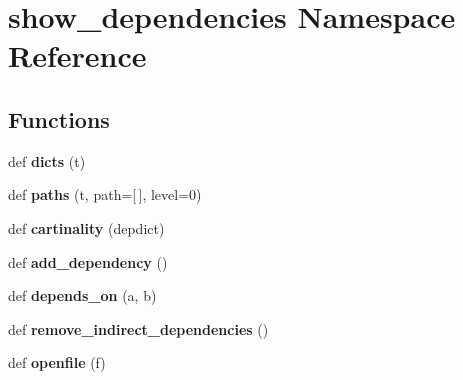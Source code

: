 \hypertarget{namespaceshow__dependencies}{}\section{show\+\_\+dependencies Namespace Reference}
\label{namespaceshow__dependencies}
\subsection*{Functions}
\begin{DoxyCompactItemize}
\item 
\mbox{\label{namespaceshow__dependencies_acdba98844f11178f2bc6d18f11091bd7}} 
def {\bfseries dicts} (t)
\item 
\mbox{\label{namespaceshow__dependencies_a70736b13e697da97e3068a42d7fbdc9c}} 
def {\bfseries paths} (t, path=\mbox{[}$\,$\mbox{]}, level=0)
\item 
\mbox{\label{namespaceshow__dependencies_a402a423f0a33fee58e8b0575f29fc843}} 
def {\bfseries cartinality} (depdict)
\item 
\mbox{\label{namespaceshow__dependencies_a343adb25514305af047ae44efa8b758f}} 
def {\bfseries add\+\_\+dependency} ()
\item 
\mbox{\label{namespaceshow__dependencies_a86272f7bfc70b0c11db737f5b49fd8e4}} 
def {\bfseries depends\+\_\+on} (a, b)
\item 
\mbox{\label{namespaceshow__dependencies_a8a1ce37486cc476c5a782674b52bd3fa}} 
def {\bfseries remove\+\_\+indirect\+\_\+dependencies} ()
\item 
\mbox{\label{namespaceshow__dependencies_a1299ea602a02e3898360c76cf947eff4}} 
def {\bfseries openfile} (f)
\end{DoxyCompactItemize}
